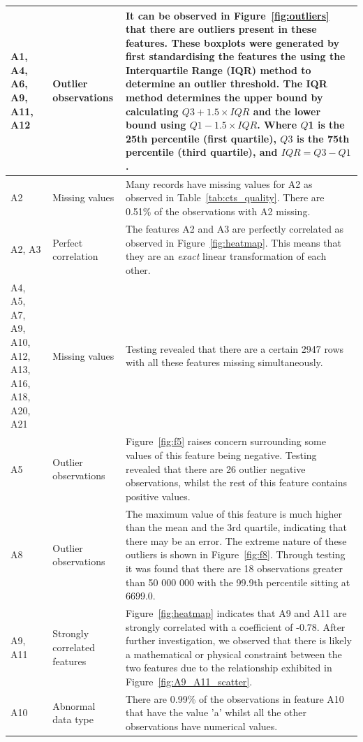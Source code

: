 \documentclass[11pt]{article}
\begin{document}
\begin{longtable}{|p{1.7cm}|p{4cm}|p{8cm}|}
	\hline 
	\endlastfoot
	A1, A4, A6, A9, A11, A12 & Outlier observations & It can be observed in Figure~\ref{fig:outliers} that there are outliers present in these features. These boxplots were generated by first standardising the features the using the Interquartile Range (IQR) method to determine an outlier threshold. The IQR method determines the upper bound by calculating $Q3 + 1.5 \times IQR$ and the lower bound using $Q1 - 1.5 \times IQR$. Where $Q$1 is the 25th percentile (first quartile), $Q3$ is the 75th percentile (third quartile), and $IQR = Q3 - Q1$.\\
	\hline
	A2 & Missing values & Many records have missing values for A2 as observed in Table~\ref{tab:cts_quality}. There are 0.51\% of the observations with A2 missing. \\
	\hline
	A2, A3 & Perfect correlation & The features A2 and A3 are perfectly correlated as observed in Figure~\ref{fig:heatmap}. This means that they are an \textit{exact} linear transformation of each other.\\
	\hline
	A4, A5, A7, A9, A10, A12, A13, A16, A18, A20, A21 & Missing values & Testing revealed that there are a certain 2947 rows with all these features missing simultaneously. \\
	\hline
	A5 & Outlier observations & Figure~\ref{fig:f5} raises concern surrounding some values of this feature being negative. Testing revealed that there are 26 outlier negative observations, whilst the rest of this feature contains positive values. \\
	\hline
	A8 & Outlier observations & The maximum value of this feature is much higher than the mean and the 3rd quartile, indicating that there may be an error. The extreme nature of these outliers is shown in Figure~\ref{fig:f8}. Through testing it was found that there are 18 observations greater than 50 000 000 with the 99.9th percentile sitting at 6699.0.\\
	\hline
	A9, A11 & Strongly correlated features & Figure~\ref{fig:heatmap} indicates that A9 and A11 are strongly correlated with a coefficient of  -0.78. After further investigation, we observed that there is likely a mathematical or physical constraint between the two features due to the relationship exhibited in Figure~\ref{fig:A9_A11_scatter}.\\
	\hline
	A10 & Abnormal data type & There are 0.99\% of the observations in feature A10 that have the value 'a' whilst all the other observations have numerical values. \\
	\hline

\end{longtable}
\end{document}
